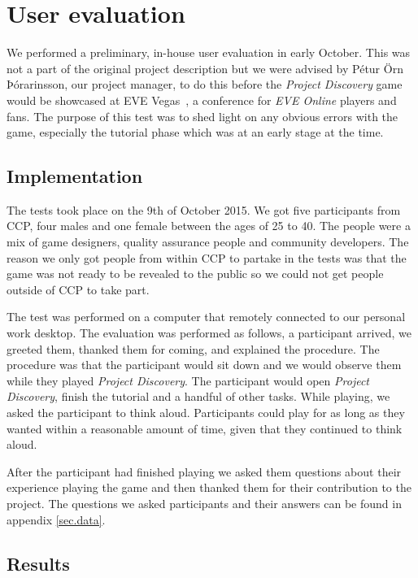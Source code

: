 \section{User evaluation}\label{sec:userevaluation}

We performed a preliminary, in-house user evaluation in early October. This was not a part of the original project description but we were advised by Pétur Örn Þórarinsson, our project manager, to do this before the \emph{Project Discovery} game would be showcased at EVE Vegas~\cite{vegas}, a conference for \emph{EVE Online} players and fans. The purpose of this test was to shed light on any obvious errors with the game, especially the tutorial phase which was at an early stage at the time.

\subsection{Implementation}
The tests took place on the 9th of October 2015. We got five participants from CCP, four males and one female between the ages of 25 to 40. The people were a mix of game designers, quality assurance people and community developers. The reason we only got people from within CCP to partake in the tests was that the game was not ready to be revealed to the public so we could not get people outside of CCP to take part.

The test was performed on a computer that remotely connected to our personal work desktop. The evaluation was performed as follows, a participant arrived, we greeted them, thanked them for coming, and explained the procedure. The procedure was that the participant would sit down and we would observe them while they played \emph{Project Discovery}. The participant would open \emph{Project Discovery}, finish the tutorial and a handful of other tasks. While playing, we asked the participant to think aloud. Participants could play for as long as they wanted within a reasonable amount of time, given that they continued to think aloud.

After the participant had finished playing we asked them questions about their experience playing the game and then thanked them for their contribution to the project. The questions we asked participants and their answers can be found in appendix \ref{sec.data}.

\subsection{Results}

